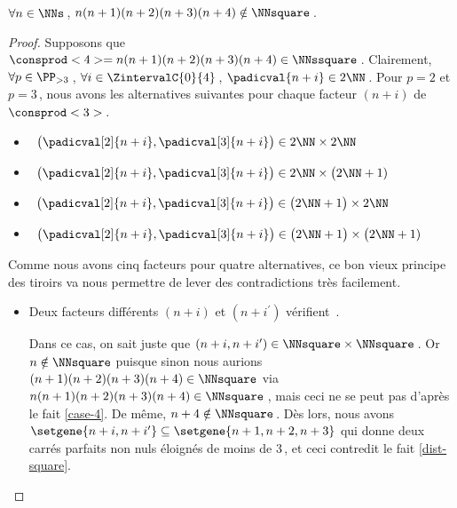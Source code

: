 \begin{fact} \label{case-5}
	 $\forall n \in \NNs$\,, $n(n+1)(n+2)(n+3)(n+4) \notin \NNsquare$\,.
\end{fact}




\begin{proof}
    Supposons que $\consprod<4> = n(n+1)(n+2)(n+3)(n+4) \in \NNssquare$\,.
    Clairement, 
    $\forall p \in \PP_{>3}$\,, 
    $\forall i \in \ZintervalC{0}{4}$\,, 
    $\padicval{n + i} \in 2 \NN$\,.
    Pour $p = 2$ et $p = 3$\,, nous avons les alternatives suivantes pour chaque facteur $(n+i)$ de $\consprod<3>$\,.
    \begin{itemize}
    	\smallskip
		\item {}\,
		$\big( \padicval[2]{n + i} , \padicval[3]{n + i} \big) \in 2 \NN \times 2 \NN$

    	\smallskip
		\item {}\,
		$\big( \padicval[2]{n + i} , \padicval[3]{n + i} \big) \in 2 \NN \times \big( 2 \NN + 1)$

    	\smallskip
		\item {}\,
		$\big( \padicval[2]{n + i} , \padicval[3]{n + i} \big) \in \big( 2 \NN + 1 \big) \times 2 \NN$

    	\smallskip
		\item {}\,
		$\big( \padicval[2]{n + i} , \padicval[3]{n + i} \big) \in \big( 2 \NN + 1 \big) \times \big( 2 \NN + 1)$
    \end{itemize}
    
    \medskip
    
    Comme nous avons cinq facteurs pour quatre alternatives, ce bon vieux principe des tiroirs va nous permettre de lever des contradictions très facilement.
    \begin{itemize}
    	\medskip
		\item Deux facteurs différents $(n+i)$ et $(n+i^\prime)$ vérifient \,.
		
		\smallskip
		\noindent
		Dans ce cas, on sait juste que $(n+i, n+i^\prime) \in \NNsquare \times \NNsquare$\,.
		Or $n \notin \NNsquare$ puisque sinon nous aurions $(n+1)(n+2)(n+3)(n+4) \in \NNsquare$ via $n(n+1)(n+2)(n+3)(n+4) \in \NNsquare$\,, mais ceci ne se peut pas d'après le fait \ref{case-4}.
		De même, $n+4 \notin \NNsquare$\,.
		Dès lors, nous avons $\setgene{n+i, n+i^\prime} \subseteq \setgene{n+1, n+2, n+3}$ qui donne deux carrés parfaits non nuls éloignés de moins de $3$\,, et ceci contredit le fait \ref{dist-square}.



\end{itemize}
\end{proof}
